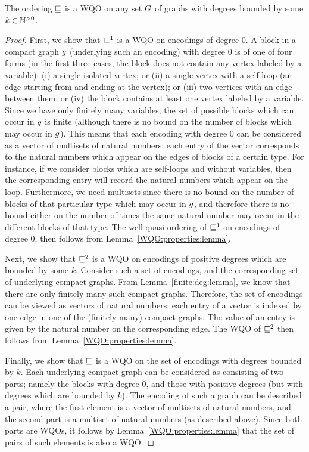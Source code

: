 \begin{lemma}
\label{encoding:WQO:lemma}
The ordering $\sqsubseteq$ is a WQO on any set $G$ of graphs with degrees bounded
by some $k\in{\mathbb N}^{>0}$.
\end{lemma}
%
\begin{proof}
First, we show that $\sqsubseteq^1$ is a WQO on encodings of degree $0$.
%
A block in a compact graph $g$ (underlying such an encoding)
with degree $0$ is of one of four forms (in the first three cases, the block
does not contain any vertex labeled by a variable):
(i) a single isolated vertex; or (ii) a single vertex with a self-loop (an edge
starting from and ending at the vertex); or
(iii) two vertices with an edge between them; or
(iv) the block contains at least one vertex labeled by a variable.
%
Since we have only finitely many variables, the set of possible blocks which can occur
in $g$ is finite
(although there is no bound on the number of blocks which may occur in $g$).
%
This means that each encoding with degree $0$ can be considered as a vector of multisets
of natural numbers: 
each entry of the vector corresponds to the natural numbers which appear
on the edges of blocks of a certain type.
%
For instance, if we consider blocks which are self-loops and without variables,
then the corresponding entry will record the natural numbers which appear on the loop.
%
Furthermore, we need multisets since there is no bound on the number
of blocks of that particular type which may occur in $g$, and therefore there is no bound
either on the number of times the same natural number may occur in the different blocks
of that type.
%
The well quasi-ordering of $\sqsubseteq^1$ on encodings of degree $0$, then follows
from Lemma~\ref{WQO:properties:lemma}.


Next, we show that $\sqsubseteq^2$ is a WQO on encodings of positive degrees
which are bounded by some $k$.
%
Consider such a set of encodings, and the corresponding set of underlying compact graphs.
%
From Lemma~\ref{finite:deg:lemma}, we know that there are only finitely many such compact
graphs.
%
Therefore, the set of encodings can be viewed as vectors of natural numbers:
each entry of a vector is indexed by one edge in one of the (finitely many) compact graphs.
%
The value of an entry is given by the natural number on the corresponding edge.
%
The WQO of $\sqsubseteq^2$ then follows from Lemma~\ref{WQO:properties:lemma}.

Finally, we show that $\sqsubseteq$ is a WQO on
the set of encodings with degrees bounded by $k$.
%
Each underlying compact graph can be considered as consisting of two parts; namely the blocks
with degree $0$, and those with positive degrees (but with degrees which
are bounded by $k$).
%
The encoding of such a graph can be described a pair, where the first element
is a vector of multisets of natural numbers, and the second part is a multiset of natural numbers
(as described above).
%
Since both parts are WQOs, it follows by  Lemma~\ref{WQO:properties:lemma}
that the set of pairs of such elements is also a WQO.
\end{proof}

